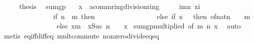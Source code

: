 \begin{isabellebody}
\ \ \isamarkupfalse%
\ \isamarkupfalse%
\ {\isacharquery}{\kern0pt}thesis\ \isacommand{{\isachardot}{\kern0pt}}\isamarkupfalse%
\isanewline
{}\isamarkupfalse%
%
\endisatagproof
{\isafoldproof}%
%
\isadelimproof
\isanewline
%
\endisadelimproof
\isanewline
{}\isamarkupfalse%
\ sum{\isacharunderscore}{\kern0pt}gp{\isacharcolon}{\kern0pt}\isanewline
\ \ \ x\ {\isacharcolon}{\kern0pt}{\isacharcolon}{\kern0pt}\ {\isachardoublequoteopen}{\isacharprime}{\kern0pt}a{\isacharcolon}{\kern0pt}{\isacharcolon}{\kern0pt}{\isacharbraceleft}{\kern0pt}comm{\isacharunderscore}{\kern0pt}ring{\isacharcomma}{\kern0pt}division{\isacharunderscore}{\kern0pt}ring{\isacharbraceright}{\kern0pt}{\isachardoublequoteclose}\isanewline
\ \ \ \ \ {\isachardoublequoteopen}{\isacharparenleft}{\kern0pt}{\isasymSum}i{\isacharequal}{\kern0pt}m{\isachardot}{\kern0pt}{\isachardot}{\kern0pt}n{\isachardot}{\kern0pt}\ x{\isacharcircum}{\kern0pt}i{\isacharparenright}{\kern0pt}\ {\isacharequal}{\kern0pt}\isanewline
\ \ \ \ \ \ \ \ \ \ \ \ \ \ \ {\isacharparenleft}{\kern0pt}if\ n\ {\isacharless}{\kern0pt}\ m\ then\ {}\isanewline
\ \ \ \ \ \ \ \ \ \ \ \ \ \ \ \ else\ if\ x\ {\isacharequal}{\kern0pt}\ {}\ then\ of{\isacharunderscore}{\kern0pt}nat{\isacharparenleft}{\kern0pt}{\isacharparenleft}{\kern0pt}n\ {\isacharplus}{\kern0pt}\ {}{\isacharparenright}{\kern0pt}\ {\isacharminus}{\kern0pt}\ m{\isacharparenright}{\kern0pt}\isanewline
\ \ \ \ \ \ \ \ \ \ \ \ \ \ \ \ else\ {\isacharparenleft}{\kern0pt}x{\isacharcircum}{\kern0pt}m\ {\isacharminus}{\kern0pt}\ x{\isacharcircum}{\kern0pt}Suc\ n{\isacharparenright}{\kern0pt}\ {\isacharslash}{\kern0pt}\ {\isacharparenleft}{\kern0pt}{}\ {\isacharminus}{\kern0pt}\ x{\isacharparenright}{\kern0pt}{\isacharparenright}{\kern0pt}{\isachardoublequoteclose}\isanewline
%
\isadelimproof
%
\endisadelimproof
%
\isatagproof
{}\isamarkupfalse%
\ sum{\isacharunderscore}{\kern0pt}gp{\isacharunderscore}{\kern0pt}multiplied\ {\isacharbrackleft}{\kern0pt}of\ m\ n\ x{\isacharbrackright}{\kern0pt}\ \isamarkupfalse%
\ auto\isanewline
{}\isamarkupfalse%
\ {\isacharparenleft}{\kern0pt}metis\ eq{\isacharunderscore}{\kern0pt}iff{\isacharunderscore}{\kern0pt}diff{\isacharunderscore}{\kern0pt}eq{\isacharunderscore}{\kern0pt}{}\ mult{\isachardot}{\kern0pt}commute\ nonzero{\isacharunderscore}{\kern0pt}divide{\isacharunderscore}{\kern0pt}eq{\isacharunderscore}{\kern0pt}eq{\isacharparenright}{\kern0pt}%

\end{isabellebody}
